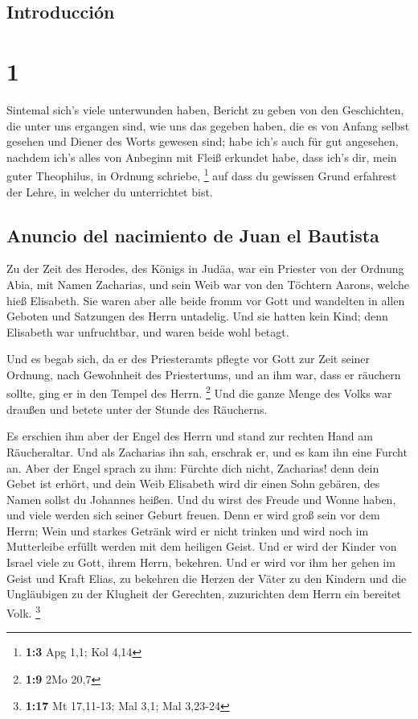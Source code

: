 \hypertarget{introducciuxf3n}{%
\subsection{Introducción}\label{introducciuxf3n}}

\hypertarget{section}{%
\section{1}\label{section}}

 Sintemal sich's viele unterwunden haben, Bericht zu geben
von den Geschichten, die unter uns ergangen sind,  wie uns
das gegeben haben, die es von Anfang selbst gesehen und Diener des Worts
gewesen sind;  habe ich's auch für gut angesehen, nachdem
ich's alles von Anbeginn mit Fleiß erkundet habe, dass ich's dir, mein
guter Theophilus, in Ordnung schriebe, \footnote{\textbf{1:3} Apg 1,1;
  Kol 4,14}  auf dass du gewissen Grund erfahrest der
Lehre, in welcher du unterrichtet bist.

\hypertarget{anuncio-del-nacimiento-de-juan-el-bautista}{%
\subsection{Anuncio del nacimiento de Juan el
Bautista}\label{anuncio-del-nacimiento-de-juan-el-bautista}}

 Zu der Zeit des Herodes, des Königs in Judäa, war ein
Priester von der Ordnung Abia, mit Namen Zacharias, und sein Weib war
von den Töchtern Aarons, welche hieß Elisabeth.  Sie waren
aber alle beide fromm vor Gott und wandelten in allen Geboten und
Satzungen des Herrn untadelig.  Und sie hatten kein Kind;
denn Elisabeth war unfruchtbar, und waren beide wohl betagt.

 Und es begab sich, da er des Priesteramts pflegte vor
Gott zur Zeit seiner Ordnung,  nach Gewohnheit des
Priestertums, und an ihm war, dass er räuchern sollte, ging er in den
Tempel des Herrn. \footnote{\textbf{1:9} 2Mo 20,7}  Und
die ganze Menge des Volks war draußen und betete unter der Stunde des
Räucherns.

 Es erschien ihm aber der Engel des Herrn und stand zur
rechten Hand am Räucheraltar.  Und als Zacharias ihn sah,
erschrak er, und es kam ihn eine Furcht an.  Aber der
Engel sprach zu ihm: Fürchte dich nicht, Zacharias! denn dein Gebet ist
erhört, und dein Weib Elisabeth wird dir einen Sohn gebären, des Namen
sollst du Johannes heißen.  Und du wirst des Freude und
Wonne haben, und viele werden sich seiner Geburt freuen. 
Denn er wird groß sein vor dem Herrn; Wein und starkes Getränk wird er
nicht trinken und wird noch im Mutterleibe erfüllt werden mit dem
heiligen Geist.  Und er wird der Kinder von Israel viele
zu Gott, ihrem Herrn, bekehren.  Und er wird vor ihm her
gehen im Geist und Kraft Elias, zu bekehren die Herzen der Väter zu den
Kindern und die Ungläubigen zu der Klugheit der Gerechten, zuzurichten
dem Herrn ein bereitet Volk. \footnote{\textbf{1:17} Mt 17,11-13; Mal
  3,1; Mal 3,23-24}

